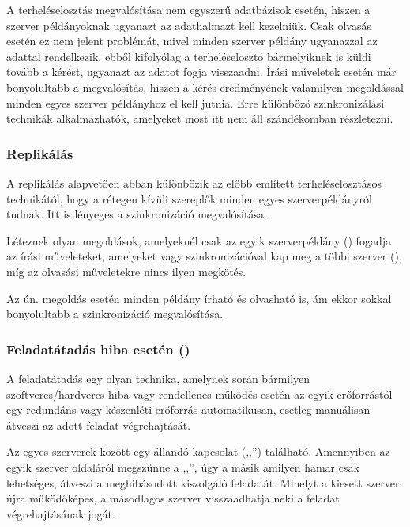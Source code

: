 A terheléselosztás megvalósítása nem egyszerű adatbázisok esetén, hiszen a szerver példányoknak ugyanazt az adathalmazt kell kezelniük. Csak olvasás esetén ez nem jelent problémát, mivel minden szerver példány ugyanazzal az adattal rendelkezik, ebből kifolyólag a terheléselosztó bármelyiknek is küldi tovább a kérést, ugyanazt az adatot fogja visszaadni.
Írási műveletek esetén már bonyolultabb a megvalósítás, hiszen a kérés eredményének valamilyen megoldással minden egyes szerver példányhoz el kell jutnia. Erre különböző szinkronizálási technikák alkalmazhatók, amelyeket most itt nem áll szándékomban részletezni.

\subsubsection{Replikálás}

A replikálás alapvetően abban különbözik az előbb említett terheléselosztásos technikától, hogy a rétegen kívüli szereplők minden egyes szerverpéldányról tudnak. Itt is lényeges a szinkronizáció megvalósítása.

Léteznek olyan megoldások, amelyeknél csak az egyik szerverpéldány () fogadja az írási műveleteket, amelyeket  vagy  szinkronizációval kap meg a többi szerver (), míg az olvasási műveletekre nincs ilyen megkötés.

Az ún.  megoldás esetén minden példány írható és olvasható is, ám ekkor sokkal bonyolultabb a szinkronizáció megvalósítása.

\subsubsection{Feladatátadás hiba esetén ()}

A feladatátadás egy olyan technika, amelynek során bármilyen szoftveres/hardveres hiba vagy rendellenes működés esetén az egyik erőforrástól egy redundáns vagy készenléti erőforrás automatikusan, esetleg manuálisan átveszi az adott feladat végrehajtását.

Az egyes szerverek között egy állandó kapcsolat (,,'') található. Amennyiben az egyik szerver oldaláról megszűnne a ,,'', úgy a másik amilyen hamar csak lehetséges, átveszi a meghibásodott kiszolgáló feladatát. Mihelyt a kiesett szerver újra működőképes, a másodlagos szerver visszaadhatja neki a feladat végrehajtásának jogát.

